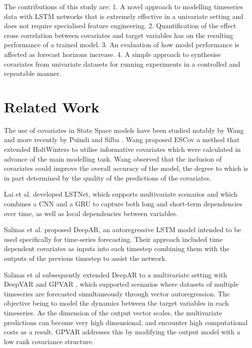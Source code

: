 \documentclass{article}
\begin{document}
The contributions of this study are:
1. A novel approach to modelling timeseries data with LSTM networks that is extremely effective in a univariate setting and does not 
require specialised feature engineering.
2. Quantification of the effect cross correlation between covariates and target variables has on the resulting performance of a trained model.
3. An evaluation of how model performance is affected as forecast horizons increase. 
4. A simple approach to synthesise covariates from univariate datasets for running experiments in a controlled and repeatable manner.


\section{Related Work}
The use of covariates in State Space models have been studied notably by Wang\cite{wang2006} and more recently by Puindi and Silba 
\cite{puindi2020dynamic}. Wang proposed ESCov a method that extended HoltWinters to utilise informative covariates which were calculated in advance 
of the main modelling task. Wang observed that the inclusion of covariates could improve the overall accuracy of the model, the degree to which is in part
determined by the quality of the predictions of the covariates. 

Lai et al. \cite{lai2018modeling} developed LSTNet, which supports multivariate scenarios and which combines a CNN and a GRU to capture both 
long and short-term dependencies over time, as well as local dependencies between variables. 

Salinas et al. \cite{salinas2019deepar} proposed DeepAR, an autoregressive LSTM model intended to be used specifically 
for time-series forecasting. Their approach included time dependent covariates as inputs into each timestep combining them 
with the outputs of the previous timestep to assist the network.

Salinas et al subsequently extended DeepAR to a multivariate setting with DeepVAR and GPVAR \cite{salinas2019highdimensional}, which supported 
scenarios where datasets of multiple timeseries are forecasted simultaneously through vector autoregression. The objective being to model the 
dynamics between the target variables in each timeseries. As the dimension of the output vector scales, the multivariate predictions can 
become very high dimensional, and encounter high computational costs as a result.  GPVAR addresses this by modifying the output model 
with a low rank covariance structure. 
\end{document}
